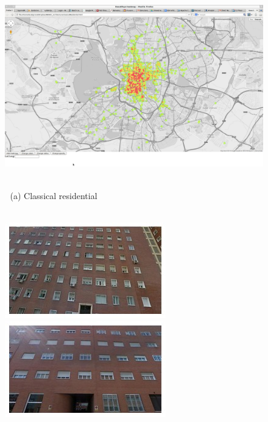 \begin{figure}[t]
\begin{minipage}{\linewidth}
\begin{minipage}{0.3\linewidth}
    \end{minipage}
    \begin{minipage}{0.7\linewidth}
      \includegraphics[trim= 350 150 250 150, clip=true, width=\linewidth]{imgs/arch/mapS2.jpg}
    \end{minipage}
  \end{minipage}
  \\
  $\;$ \hspace{30mm} (a) Classical residential
  \\
  \\
  \begin{minipage}{\linewidth}
    \begin{minipage}{0.3\linewidth}
      \includegraphics[width=0.49\linewidth]{imgs/arch/mosaicsS3/mosaic0000.jpg}
      \includegraphics[width=0.49\linewidth]{imgs/arch/mosaicsS3/mosaic0001.jpg}
      \\ \vspace{-3mm} \\

\end{minipage}
\end{minipage}
\end{figure}
